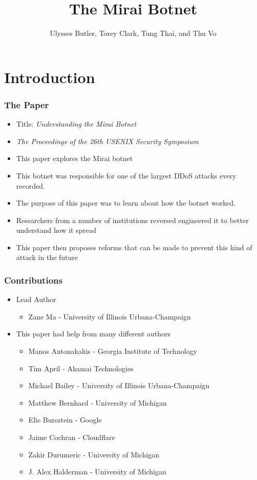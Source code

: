 \documentclass{beamer}
\title{The Mirai Botnet}
\author{Ulysses Butler, Torey Clark, Tung Thai, and Thu Vo}
\institute{ Truman State University \\ Binary Beasts }
\date{}
\begin{document}
\maketitle

\section{Introduction}

\begin{frame}
	\frametitle{The Paper}
	\begin{itemize}
		\item Title: \textit{Understanding the Mirai Botnet}
		\item \textit{The Proceedings of the 26th USENIX Security Symposium}
		\item This paper explores the Mirai botnet
		\item This botnet was responsible for one of the largest DDoS attacks every recorded.
		\item The purpose of this paper was to learn about how the botnet worked.
		\item Researchers from a number of institutions reversed engineered it to better understand how it spread
		\item This paper then proposes reforms that can be made to prevent this kind of attack in the future
	\end{itemize}
\end{frame}

\begin{frame}
	\frametitle{Contributions}
	\begin{itemize}
		\item Lead Author
		\begin{itemize}
			\item Zane Ma - University of Illinois Urbana-Champaign
		\end{itemize}
		\item This paper had help from many different authors
		\begin{itemize}
			\item Manos Antonakakis - Georgia Institute of Technology
			\item Tim April - Akamai Technologies
			\item Michael Bailey - University of Illinois Urbana-Champaign
			\item Matthew Bernhard - University of Michigan
			\item Elie Bursztein - Google
			\item Jaime Cochran - Cloudflare
			\item Zakir Durumeric - University of Michigan
			\item J. Alex Halderman - University of Michigan
		\end{itemize}
	\end{itemize}
\end{frame}
\end{document}
